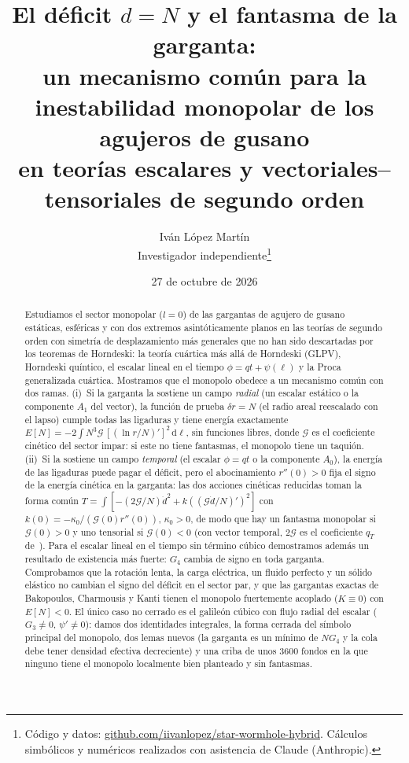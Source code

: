\documentclass[11pt,a4paper]{article}
\title{El déficit $d=N$ y el fantasma de la garganta:\\
un mecanismo común para la inestabilidad monopolar de los agujeros de gusano\\
en teorías escalares y vectoriales--tensoriales de segundo orden}
\author{Iván López Martín\\[2pt]
\small Investigador independiente\thanks{Código y datos: \href{https://github.com/iivanlopez/star-wormhole-hybrid}{github.com/iivanlopez/star-wormhole-hybrid}. Cálculos simbólicos y numéricos realizados con asistencia de Claude (Anthropic).}}
\date{27 de octubre de 2026}
\theoremstyle{remark}
\newcommand{\G}{\mathcal G}
\newcommand{\dd}{\mathrm d}
\begin{document}
\maketitle

\begin{abstract}
Estudiamos el sector monopolar ($l=0$) de las gargantas de agujero de gusano estáticas, esféricas y con dos extremos asintóticamente planos en las teorías de segundo orden con simetría de desplazamiento más generales que no han sido descartadas por los teoremas de Horndeski: la teoría cuártica más allá de Horndeski (GLPV), Horndeski quíntico, el escalar lineal en el tiempo $\phi=qt+\psi(\ell)$ y la Proca generalizada cuártica. Mostramos que el monopolo obedece a un mecanismo común con dos ramas. (i)~Si la garganta la sostiene un campo \emph{radial} (un escalar estático o la componente $A_1$ del vector), la función de prueba $\delta r=N$ (el radio areal reescalado con el lapso) cumple todas las ligaduras y tiene energía exactamente
$E[N]=-2\int N^3\G\,[(\ln r/N)']^2\,\dd\ell$, sin funciones libres, donde $\G$ es el coeficiente cinético del sector impar: si este no tiene fantasmas, el monopolo tiene un taquión. (ii)~Si la sostiene un campo \emph{temporal} (el escalar $\phi=qt$ o la componente $A_0$), la energía de las ligaduras puede pagar el déficit, pero el abocinamiento $r''(0)>0$ fija el signo de la energía cinética en la garganta: las dos acciones cinéticas reducidas toman la forma común $T=\int[-(2\G/N)\dot d^2+k((\G\dot d/N)')^2]$ con $k(0)=-\kappa_0/(\G(0)r''(0))$, $\kappa_0>0$, de modo que hay un fantasma monopolar si $\G(0)>0$ y uno tensorial si $\G(0)<0$ (con vector temporal, $2\G$ es el coeficiente $q_T$ de~\cite{DeFeliceProca}). Para el escalar lineal en el tiempo sin término cúbico demostramos además un resultado de existencia más fuerte: $G_4$ cambia de signo en toda garganta. Comprobamos que la rotación lenta, la carga eléctrica, un fluido perfecto y un sólido elástico no cambian el signo del déficit en el sector par, y que las gargantas exactas de Bakopoulos, Charmousis y Kanti tienen el monopolo fuertemente acoplado ($K\equiv0$) con $E[N]<0$. El único caso no cerrado es el galileón cúbico con flujo radial del escalar ($G_3\neq0$, $\psi'\neq0$): damos dos identidades integrales, la forma cerrada del símbolo principal del monopolo, dos lemas nuevos (la garganta es un mínimo de $N G_4$ y la cola debe tener densidad efectiva decreciente) y una criba de unos 3600 fondos en la que ninguno tiene el monopolo localmente bien planteado y sin fantasmas.
\end{abstract}
\end{document}
